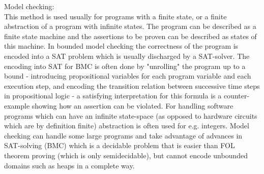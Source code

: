 Model checking:\\
This method is used usually for programs with a finite state, or a finite abstraction of a program with infinite states.
The program can be described as a finite state machine and the assertions to be proven can be described as states of this machine.
In bounded model checking the correctness of the program is encoded into a SAT problem which is usually discharged by a SAT-solver.
The encoding into SAT for BMC is often done by "unrolling" the program up to a bound - introducing propositional variables for each program variable and each execution step, and encoding the transition relation between successive time steps in propositional logic - a satisfying interpretation for this formula is a counter-example showing how an assertion can be violated.
For handling software programs which can have an infinite state-space (as opposed to hardware circuits which are by definition finite) abstraction is often used for e.g. integers.
Model checking can handle some large programs and take advantage of advances in SAT-solving (BMC) which is a decidable problem that is easier than FOL theorem proving (which is only semidecidable), but cannot encode unbounded domains such as heaps in a complete way.

	
	
